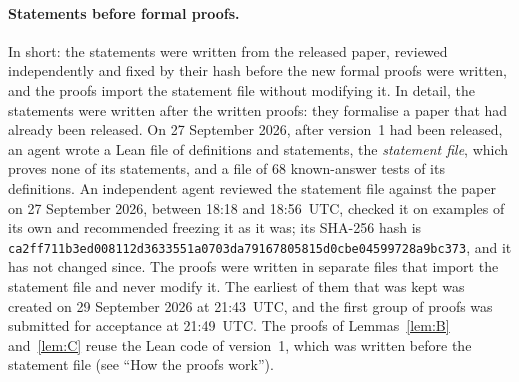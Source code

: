 \documentclass[11pt]{article}
\theoremstyle{remark}
\begin{document}
\paragraph{Statements before formal proofs.}
In short: the statements were written from the released paper, reviewed
independently and fixed by their hash before the new formal proofs were
written, and the proofs import the statement file without modifying it. In
detail, the statements were written after the written proofs: they formalise a
paper that had already been released. On 27 September 2026, after version~1
had been released, an agent wrote a Lean file of definitions and statements,
the \emph{statement file}, which proves none of its statements, and a file of
$68$ known-answer tests of its definitions. An independent agent reviewed the
statement file against the paper on 27 September 2026, between 18:18 and
18:56~UTC, checked it on examples of its own and recommended freezing it as it
was; its SHA-256 hash is
\texttt{ca2ff711b3ed008112d3633551a0703d\allowbreak a79167805815d0cbe04599728a9bc373},
and it has not changed since. The proofs were written in separate files that
import the statement file and never modify it. The earliest of them that was
kept was created on 29 September 2026 at 21:43~UTC, and the first group of
proofs was submitted for acceptance at 21:49~UTC. The proofs of Lemmas~\ref{lem:B} and~\ref{lem:C} reuse the
Lean code of version~1, which was written before the statement file (see ``How
the proofs work'').
\end{document}
